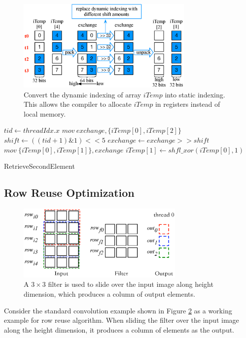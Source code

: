 \begin{figure}[t!]
	\centering
	\includegraphics[width=\columnwidth,height=4.5cm]{./figure/exchange.eps}
\caption{Convert the dynamic indexing of array $iTemp$ into static indexing. This allows the compiler to allocate $iTemp$ in registers instead of local memory.}
\label{fig:exchange}
\end{figure}


\begin{algorithm}[t!]
\small
	$tid \gets threadIdx.x$\;
	$mov\ exchange, \{iTemp[0], iTemp[2]\}$\;
	$shift \gets ((tid+1)\&1)<<5$\;
	$exchange \gets exchange >> shift$\;
	$mov\ \{iTemp[0],iTemp[1]\}, exchange$\;
	$iTemp[1] \gets shfl\_xor(iTemp[0],1)$\;	
	\caption{RetrieveSecondElement}
	\label{algo:basic2}
\end{algorithm}


\subsection{Row Reuse Optimization}
\label{sec:rowreuse}
\begin{figure}
	\centering
	\includegraphics[width=0.9\columnwidth,height=3.7cm]{./figure/rowreuse.eps}
\caption{A $3 \times 3$ filter is used to slide over the input image along height dimension, which produces a column of output elements.}
\label{fig:rowreuse}
\end{figure}

 Consider the standard convolution example shown in Figure \ref{fig:rowreuse} as a working example for row reuse
algorithm. When sliding the filter over the input image along the height dimension, it produces a column of elements as the output.


